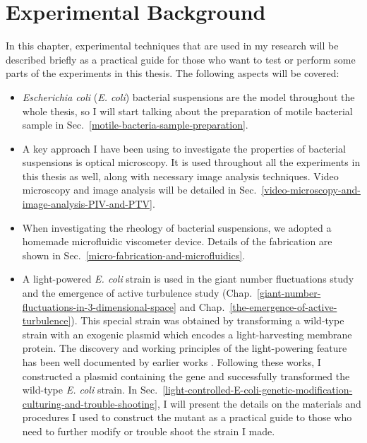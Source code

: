 

\chapter{Experimental Background}
\label{experimental-background}
In this chapter, experimental techniques that are used in my research will be described briefly as a practical guide for those who want to test or perform some parts of the experiments in this thesis. The following aspects will be covered:
\begin{itemize}
\item \textit{Escherichia coli} (\textit{E. coli}) bacterial suspensions are the model throughout the whole thesis, so I will start talking about the preparation of motile bacterial sample in Sec.~\ref{motile-bacteria-sample-preparation}.
\item A key approach I have been using to investigate the properties of bacterial suspensions is optical microscopy. It is used throughout all the experiments in this thesis as well, along with necessary image analysis techniques. Video microscopy and image analysis will be detailed in
Sec.~\ref{video-microscopy-and-image-analysis-PIV-and-PTV}.
\item When investigating the rheology of bacterial suspensions, we adopted a homemade microfluidic viscometer device. Details of the fabrication are shown in Sec.~\ref{micro-fabrication-and-microfluidics}.
\item A light-powered \textit{E. coli} strain is used in the giant number fluctuations study and the emergence of active turbulence study
(Chap.~\ref{giant-number-fluctuations-in-3-dimensional-space} and Chap.~\ref{the-emergence-of-active-turbulence}). This special strain was obtained by transforming a wild-type strain with an exogenic plasmid which encodes a light-harvesting membrane protein. The discovery and working principles of the light-powering feature has been well documented by earlier works
\cite{Beja2000, Subramanlam2000, DelaTorre2003, Walter2007, Claassens2013}. Following these works, I constructed a plasmid containing the gene and successfully transformed the wild-type \textit{E. coli} strain.
In Sec.~\ref{light-controlled-E-coli-genetic-modification-culturing-and-trouble-shooting}, I will present the details on the materials and procedures I used to construct the mutant as a practical guide to those who need to further modify or trouble shoot the strain I made.
\end{itemize}

